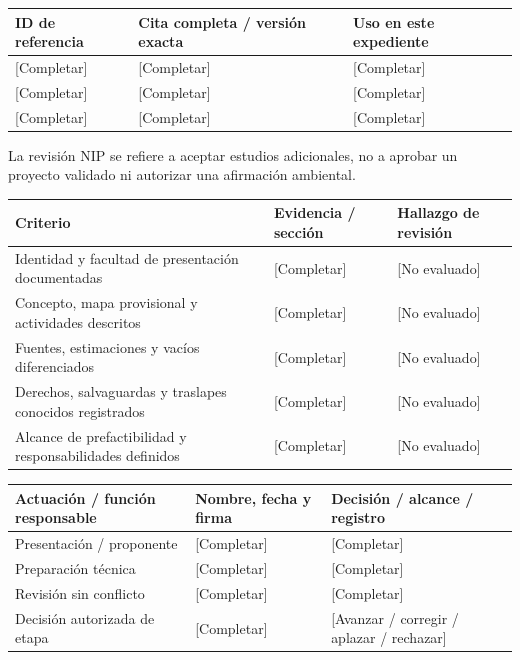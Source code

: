 {\sffamily\fontsize{8.3}{10.3}\selectfont\begin{longtable}{@{}P{29.69mm} P{82.48mm} P{52.79mm}@{}}
\toprule
\textbf{ID de referencia} & \textbf{Cita completa / versión exacta} & \textbf{Uso en este expediente}\\\midrule\endhead
\rule{0pt}{7.7mm}[Completar] & [Completar] & [Completar]\\\hline
\rule{0pt}{7.7mm}[Completar] & [Completar] & [Completar]\\\hline
\rule{0pt}{7.7mm}[Completar] & [Completar] & [Completar]\\\hline
\end{longtable}}
\begin{Notice}La revisión NIP se refiere a aceptar estudios adicionales, no a aprobar un proyecto validado ni autorizar una afirmación ambiental.\end{Notice}
{\sffamily\fontsize{8.3}{10.3}\selectfont\begin{longtable}{@{}P{80.84mm} P{42.89mm} P{41.24mm}@{}}
\toprule
\textbf{Criterio} & \textbf{Evidencia / sección} & \textbf{Hallazgo de revisión}\\\midrule\endhead
\rule{0pt}{7.7mm}Identidad y facultad de presentación documentadas & [Completar] & [No evaluado]\\\hline
\rule{0pt}{7.7mm}Concepto, mapa provisional y actividades descritos & [Completar] & [No evaluado]\\\hline
\rule{0pt}{7.7mm}Fuentes, estimaciones y vacíos diferenciados & [Completar] & [No evaluado]\\\hline
\rule{0pt}{7.7mm}Derechos, salvaguardas y traslapes conocidos registrados & [Completar] & [No evaluado]\\\hline
\rule{0pt}{7.7mm}Alcance de prefactibilidad y responsabilidades definidos & [Completar] & [No evaluado]\\\hline
\end{longtable}}
{\sffamily\fontsize{8.3}{10.3}\selectfont\begin{longtable}{@{}P{51.14mm} P{56.09mm} P{57.74mm}@{}}
\toprule
\textbf{Actuación / función responsable} & \textbf{Nombre, fecha y firma} & \textbf{Decisión / alcance / registro}\\\midrule\endhead
\rule{0pt}{7.7mm}Presentación / proponente & [Completar] & [Completar]\\\hline
\rule{0pt}{7.7mm}Preparación técnica & [Completar] & [Completar]\\\hline
\rule{0pt}{7.7mm}Revisión sin conflicto & [Completar] & [Completar]\\\hline
\rule{0pt}{7.7mm}Decisión autorizada de etapa & [Completar] & [Avanzar / corregir / aplazar / rechazar]\\\hline
\end{longtable}}
